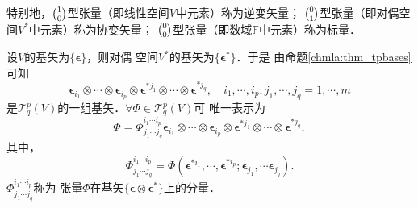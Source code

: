 特别地，$\binom{1}{0}$型张量（即线性空间$V$中元素）称为{\heiti 逆变矢量}；
$\binom{0}{1}$型张量（即对偶空间$V^*$中元素）称为{\heiti 协变矢量}；
$\binom{0}{0}$型张量（即数域$\mathbb{F}$中元素）称为{\heiti 标量}．


设$V$的基矢为$\{\boldsymbol{\epsilon}\}$，则对偶
空间$V^*$的基矢为$\{\boldsymbol{\epsilon}^{*}\}$．于是
由命题\ref{chmla:thm_tpbases}可知
\begin{equation}
    \boldsymbol{\epsilon}_{i_1} \otimes\cdots\otimes \boldsymbol{\epsilon}_{i_p} \otimes
    \boldsymbol{\epsilon}^{*j_1} \otimes\cdots\otimes \boldsymbol{\epsilon}^{*j_q}, \quad
    i_1, \cdots, i_p; j_1, \cdots, j_q = 1,\cdots, m
\end{equation}
是$\mathcal{T}^p_q(V)$的一组基矢．$\forall \Phi \in \mathcal{T}^p_q(V)$可
唯一表示为
\begin{equation}\label{chmla:eqn_tmp201}
    \Phi = \Phi^{i_1 \cdots i_p} _{j_1 \cdots j_q}
    \boldsymbol{\epsilon}_{i_1} \otimes\cdots\otimes \boldsymbol{\epsilon}_{i_p} \otimes
    \boldsymbol{\epsilon}^{*j_1} \otimes\cdots\otimes \boldsymbol{\epsilon}^{*j_q},
\end{equation}
其中，
\begin{equation}\label{chmla:eqn_tmp203}
    \Phi^{i_1 \cdots i_p} _{j_1 \cdots j_q} =
    \Phi(\boldsymbol{\epsilon}^{*i_1}, \cdots, \boldsymbol{\epsilon}^{*i_p};
    \boldsymbol{\epsilon}_{j_1},\cdots \boldsymbol{\epsilon}_{j_q}) .
\end{equation}
$\Phi^{i_1 \cdots i_p} _{j_1 \cdots j_q}$称为
张量$\Phi$在基矢$\{\boldsymbol{\epsilon}\otimes\boldsymbol{\epsilon}^{*}\}$上的{\heiti 分量}．

